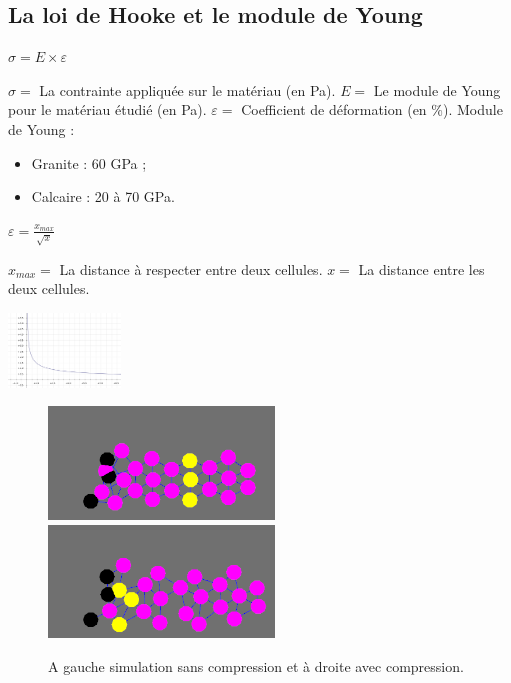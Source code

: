\documentclass{beamer}
\begin{document}
\subsection{La loi de Hooke et le module de Young}
\begin{frame}
  \begin{center}
    $\sigma = E \times \varepsilon$
  \end{center}
  $\sigma = $ La contrainte appliquée sur le matériau (en Pa). $E = $ Le module de Young pour le matériau étudié (en Pa). $\varepsilon = $ Coefficient de déformation (en $\%$). \smallbreak
  Module de Young :
  \begin{itemize}
    \item Granite : 60 GPa ;
    \item Calcaire : 20 à 70 GPa.
  \end{itemize}
  \smallbreak
  \begin{center}
    $\varepsilon = \frac{x_{max}}{\sqrt{x}}$
  \end{center}
  $x_{max} = $ La distance à respecter entre deux cellules. $x = $ La distance entre les deux cellules. \smallbreak
  \begin{center}
    \includegraphics[width=3cm]{Images/compression_kmplot.png}
  \end{center}
\end{frame}

\begin{frame}
  \begin{figure}
    \begin{center}
      \includegraphics[width=6cm]{Images/no_compression.png}
      \includegraphics[width=6cm]{Images/compression.png}
    \end{center}
    \caption{A gauche simulation sans compression et à droite avec compression.}
  \end{figure}
\end{frame}
\end{document}

